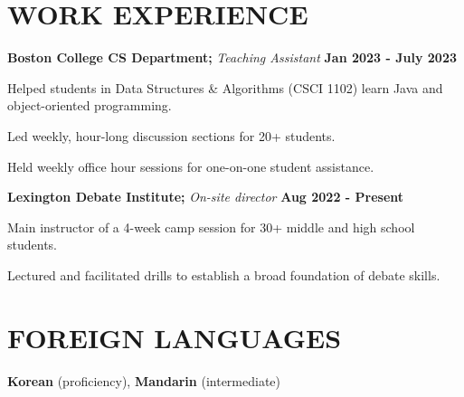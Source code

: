\documentclass[11pt]{article}
\begin{document}
\section*{WORK EXPERIENCE}
\textbf{Boston College CS Department;} \textit{Teaching Assistant} \hfill \textbf{Jan 2023 - July 2023}
\begin{sublist}
	\item Helped students in Data Structures \& Algorithms (CSCI 1102) learn Java and object-oriented programming. 
	\item Led weekly, hour-long discussion sections for 20+ students. 
	\item Held weekly office hour sessions for one-on-one student assistance.
\end{sublist}

\raggedright
\textbf{Lexington Debate Institute;} \textit{On-site director} \hfill \textbf{Aug 2022 - Present} 
\begin{sublist}
	\item Main instructor of a 4-week camp session for 30+ middle and high school students. 
	\item Lectured and facilitated drills to establish a broad foundation of debate skills.
\end{sublist}

\section*{FOREIGN LANGUAGES}
\textbf{Korean} (proficiency), \textbf{Mandarin} (intermediate)
\end{document}

